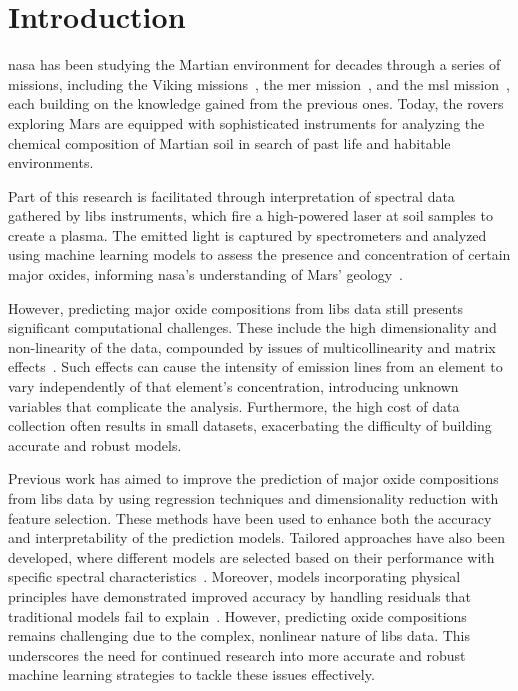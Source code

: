 \section{Introduction}\label{sec:introduction}
\gls{nasa} has been studying the Martian environment for decades through a series of missions, including the Viking missions~\cite{marsnasagov_vikings}, the \gls{mer} mission~\cite{marsnasagov_observer, marsnasagov_spirit_opportunity}, and the \gls{msl} mission~\cite{marsnasagov_msl}, each building on the knowledge gained from the previous ones.
Today, the rovers exploring Mars are equipped with sophisticated instruments for analyzing the chemical composition of Martian soil in search of past life and habitable environments.

Part of this research is facilitated through interpretation of spectral data gathered by \gls{libs} instruments, which fire a high-powered laser at soil samples to create a plasma.
The emitted light is captured by spectrometers and analyzed using machine learning models to assess the presence and concentration of certain major oxides, informing \gls{nasa}'s understanding of Mars' geology~\cite{cleggRecalibrationMarsScience2017}.

However, predicting major oxide compositions from \gls{libs} data still presents significant computational challenges.
These include the high dimensionality and non-linearity of the data, compounded by issues of multicollinearity and matrix effects~\cite{andersonImprovedAccuracyQuantitative2017}.
Such effects can cause the intensity of emission lines from an element to vary independently of that element's concentration, introducing unknown variables that complicate the analysis.
Furthermore, the high cost of data collection often results in small datasets, exacerbating the difficulty of building accurate and robust models.

Previous work has aimed to improve the prediction of major oxide compositions from \gls{libs} data by using regression techniques and dimensionality reduction with feature selection.
These methods have been used to enhance both the accuracy and interpretability of the prediction models.
Tailored approaches have also been developed, where different models are selected based on their performance with specific spectral characteristics~\cite{rezaei_dimensionality_reduction, andersonPostlandingMajorElement2022}.
Moreover, models incorporating physical principles have demonstrated improved accuracy by handling residuals that traditional models fail to explain~\cite{song_DF-K-ELM}.
However, predicting oxide compositions remains challenging due to the complex, nonlinear nature of \gls{libs} data.
This underscores the need for continued research into more accurate and robust machine learning strategies to tackle these issues effectively.

